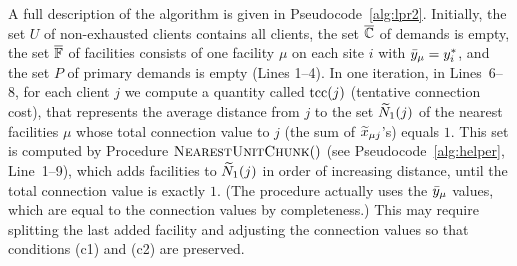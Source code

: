 \documentclass[11pt]{article}
\begin{document}
A full description of the algorithm is given in
Pseudocode~\ref{alg:lpr2}.  Initially, the set $U$ of
non-exhausted clients contains all clients, the set
$\overline{\mathbb{C}}$ of demands is empty, the set $\overline{\mathbb{F}}$ of
facilities consists of one facility $\mu$ on each site $i$
with ${\bar y}_\mu = y^\ast_i$, and the set $P$ of primary
demands is empty (Lines 1--4).  In one iteration, in
Lines~6--8, for each client $j$ we compute a quantity called
$\textrm{tcc}(j)$ (tentative connection cost), that represents the
average distance from $j$ to the set ${\widetilde N}_1(j)$ of the
nearest facilities $\mu$ whose total connection value to $j$
(the sum of ${\widetilde x}_{\mu j}$'s) equals $1$.  This set is
computed by Procedure ${\textsc{NearestUnitChunk}}()$
(see Pseudocode~\ref{alg:helper}, Line~1--9), which adds
facilities to ${\widetilde N}_1(j)$ in order of increasing
distance, until the total connection value is exactly
$1$. (The procedure actually uses the ${\bar y}_\mu$ values,
which are equal to the connection values by completeness.)
This may require splitting the last added facility and
adjusting the connection values so that conditions (c1) and
(c2) are preserved.

\end{document}
